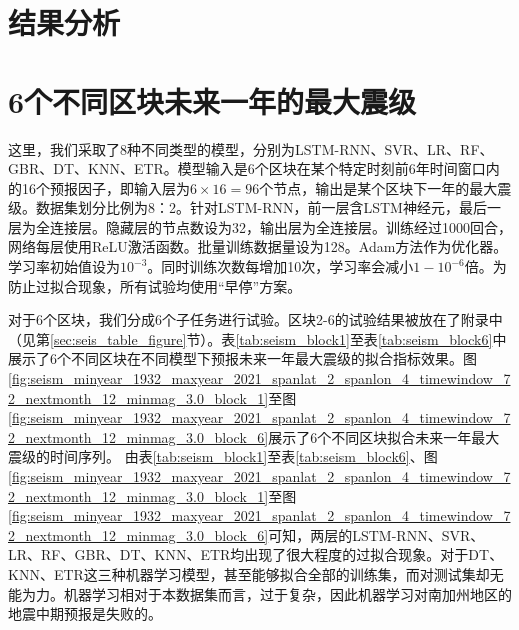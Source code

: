 \section{结果分析}\label{sec:seism_result}

\section{6个不同区块未来一年的最大震级}\label{sec:seism_result_6}

这里，我们采取了8种不同类型的模型，分别为LSTM-RNN、SVR、LR、RF、GBR、DT、KNN、ETR。模型输入是6个区块在某个特定时刻前6年时间窗口内的16个预报因子，即输入层为$6\times 16=96$个节点，输出是某个区块下一年的最大震级。数据集划分比例为8：2。针对LSTM-RNN，前一层含LSTM神经元，最后一层为全连接层。隐藏层的节点数设为32，输出层为全连接层。训练经过1000回合，网络每层使用ReLU激活函数。批量训练数据量设为128。Adam方法作为优化器。学习率初始值设为$10^{-3}$。同时训练次数每增加10次，学习率会减小$1-10^{-6}$倍。为防止过拟合现象，所有试验均使用“早停”方案。

对于6个区块，我们分成6个子任务进行试验。区块2-6的试验结果被放在了附录中（见第\ref{sec:seis_table_figure}节）。表\ref{tab:seism_block1}至表\ref{tab:seism_block6}中展示了6个不同区块在不同模型下预报未来一年最大震级的拟合指标效果。图\ref{fig:seism_minyear_1932_maxyear_2021_spanlat_2_spanlon_4_timewindow_72_nextmonth_12_minmag_3.0_block_1}至图\ref{fig:seism_minyear_1932_maxyear_2021_spanlat_2_spanlon_4_timewindow_72_nextmonth_12_minmag_3.0_block_6}展示了6个不同区块拟合未来一年最大震级的时间序列。
由表\ref{tab:seism_block1}至表\ref{tab:seism_block6}、图\ref{fig:seism_minyear_1932_maxyear_2021_spanlat_2_spanlon_4_timewindow_72_nextmonth_12_minmag_3.0_block_1}至图\ref{fig:seism_minyear_1932_maxyear_2021_spanlat_2_spanlon_4_timewindow_72_nextmonth_12_minmag_3.0_block_6}可知，两层的LSTM-RNN、SVR、LR、RF、GBR、DT、KNN、ETR均出现了很大程度的过拟合现象。对于DT、KNN、ETR这三种机器学习模型，甚至能够拟合全部的训练集，而对测试集却无能为力。机器学习相对于本数据集而言，过于复杂，因此机器学习对南加州地区的地震中期预报是失败的。

